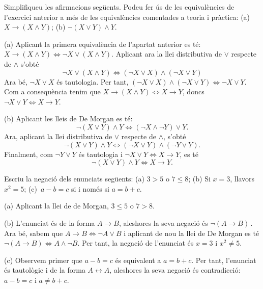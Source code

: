 \begin{exer}
Simplifiqueu les afirmacions seg\"{u}ents. Podeu fer \'{u}s de les
equival\`{e}ncies de l'exercici anterior a m\'{e}s de les equival\`{e}ncies
comentades a teoria i pr\`{a}ctica: (a) $X\longrightarrow\left(  X\wedge
Y\right)  $; (b) $\lnot\left(  X\vee Y\right)  \wedge Y$.
\end{exer}

\begin{solucio}
(a) Aplicant la primera equival\`{e}ncia de l'apartat anterior es t\'{e}:
$X\longrightarrow\left(  X\wedge Y\right)  \Longleftrightarrow\lnot
X\vee\left(  X\wedge Y\right)  $. Aplicant ara la llei distributiva de $\vee$
respecte de $\wedge$ s'obt\'{e}%
\[
\lnot X\vee\left(  X\wedge Y\right)  \Longleftrightarrow\left(  \lnot X\vee
X\right)  \wedge\left(  \lnot X\vee Y\right)
\]
Ara b\'{e}, $\lnot X\vee X$ \'{e}s tautologia. Per tant, $\left(  \lnot X\vee
X\right)  \wedge\left(  \lnot X\vee Y\right)  \Longleftrightarrow\lnot X\vee Y
$. Com a consequ\`{e}ncia tenim que $X\longrightarrow\left(  X\wedge Y\right)
\Longleftrightarrow X\longrightarrow Y$, doncs $\lnot X\vee
Y\Longleftrightarrow X\longrightarrow Y$.

(b) Aplicant les lleis de De Morgan es t\'{e}:%
\[
\lnot\left(  X\vee Y\right)  \wedge Y\Longleftrightarrow\left(  \lnot
X\wedge\lnot Y\right)  \vee Y.
\]
Ara, aplicant la llei distributiva de $\vee$ respecte de $\wedge$, s'obt\'{e}
\[
\lnot\left(  X\vee Y\right)  \wedge Y\Longleftrightarrow\left(  \lnot X\vee
Y\right)  \wedge\left(  \lnot Y\vee Y\right)  .
\]
Finalment, com $\lnot Y\vee Y$ \'{e}s tautologia i $\lnot X\vee
Y\Longleftrightarrow X\longrightarrow Y$, es t\'{e}%
\[
\lnot\left(  X\vee Y\right)  \wedge Y\Longleftrightarrow X\longrightarrow
Y\text{.}%
\]

\end{solucio}

\begin{exer}
Escriu la negaci\'{o} dels enunciats seg\"{u}ents: (a) $3>5$ o $7\leq8$; (b)
Si $x=3$, llavors $x^{2}=5$; (c)\ $a-b=c$ si i nom\'{e}s si $a=b+c$.
\end{exer}

\begin{solucio}
(a) Aplicant la llei de de Morgan, $3\leq5$ o $7>8$.

(b) L'enunciat \'{e}s de la forma $A\longrightarrow B$, aleshores la seva
negaci\'{o} \'{e}s $\lnot\left(  A\longrightarrow B\right)  \,$. Ara b\'{e},
sabem que $A\longrightarrow B\Longleftrightarrow\lnot A\vee B$ i aplicant de
nou la llei de De Morgan es t\'{e} $\lnot\left(  A\longrightarrow B\right)
\Longleftrightarrow A\wedge\lnot B$. Per tant, la negaci\'{o} de l'enunciat
\'{e}s $x=3$ i $x^{2}\neq5$.

(c) Observem primer que $a-b=c$ \'{e}s equivalent a $a=b+c$. Per tant,
l'enunciat \'{e}s tautol\`{o}gic i de la forma $A\longleftrightarrow A$,
aleshores la seva negaci\'{o} \'{e}s contradicci\'{o}: $a-b=c$ i $a\neq b+c$.
\end{solucio}

